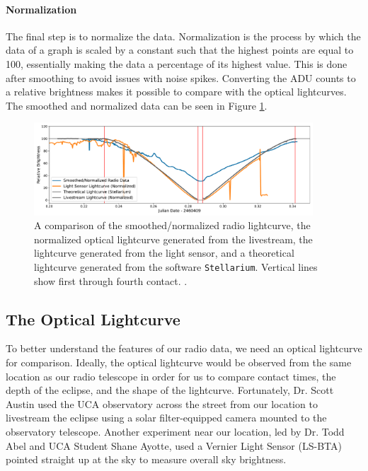 \paragraph{Normalization}
The final step is to normalize the data.
Normalization is the process by which the data of a graph is scaled by a constant such that the highest points are equal to 100, essentially making the data a percentage of its highest value.
This is done after smoothing to avoid issues with noise spikes.
Converting the ADU counts to a relative brightness makes it possible to compare with the optical lightcurves.
The smoothed and normalized data can be seen in Figure \ref{fig:LightcurveComparison}.


\begin{figure}[h]
    \includegraphics[width=0.93\textwidth]{figures/LightcurveComparison.pdf}
    \caption{\label{fig:LightcurveComparison} A comparison of the smoothed/normalized radio lightcurve, the normalized optical lightcurve generated from the livestream, the lightcurve generated from the light sensor, and a theoretical lightcurve generated from the software \texttt{Stellarium}. Vertical lines show first through fourth contact. \protect.}
\end{figure}



\subsection{\label{sec:optical}The Optical Lightcurve}

To better understand the features of our radio data, we need an optical lightcurve for comparison.
Ideally, the optical lightcurve would be observed from the same location as our radio telescope in order for us to compare contact times, the depth of the eclipse, and the shape of the lightcurve.
Fortunately, Dr. Scott Austin used the UCA observatory across the street from our location to livestream the eclipse using a solar filter-equipped camera mounted to the observatory telescope.
Another experiment near our location, led by Dr. Todd Abel and UCA Student Shane Ayotte, used a Vernier Light Sensor (LS-BTA) pointed straight up at the sky to measure overall sky brightness.
